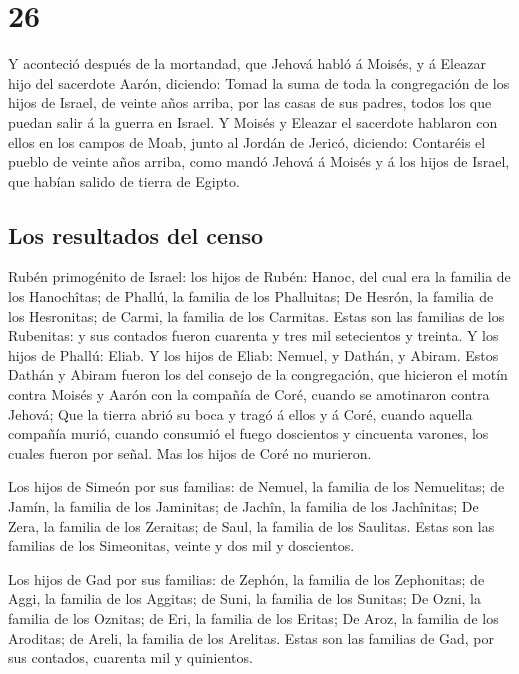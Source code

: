 \hypertarget{section-25}{%
\section{26}\label{section-25}}

 Y aconteció después de la mortandad, que Jehová habló á
Moisés, y á Eleazar hijo del sacerdote Aarón, diciendo: 
Tomad la suma de toda la congregación de los hijos de Israel, de veinte
años arriba, por las casas de sus padres, todos los que puedan salir á
la guerra en Israel.  Y Moisés y Eleazar el sacerdote
hablaron con ellos en los campos de Moab, junto al Jordán de Jericó,
diciendo:  Contaréis el pueblo de veinte años arriba, como
mandó Jehová á Moisés y á los hijos de Israel, que habían salido de
tierra de Egipto.

\hypertarget{los-resultados-del-censo-1}{%
\subsection{Los resultados del censo}\label{los-resultados-del-censo-1}}

 Rubén primogénito de Israel: los hijos de Rubén: Hanoc,
del cual era la familia de los Hanochîtas; de Phallú, la familia de los
Phalluitas;  De Hesrón, la familia de los Hesronitas; de
Carmi, la familia de los Carmitas.  Estas son las familias
de los Rubenitas: y sus contados fueron cuarenta y tres mil setecientos
y treinta.  Y los hijos de Phallú: Eliab.  Y
los hijos de Eliab: Nemuel, y Dathán, y Abiram. Estos Dathán y Abiram
fueron los del consejo de la congregación, que hicieron el motín contra
Moisés y Aarón con la compañía de Coré, cuando se amotinaron contra
Jehová;  Que la tierra abrió su boca y tragó á ellos y á
Coré, cuando aquella compañía murió, cuando consumió el fuego doscientos
y cincuenta varones, los cuales fueron por señal.  Mas
los hijos de Coré no murieron.

 Los hijos de Simeón por sus familias: de Nemuel, la
familia de los Nemuelitas; de Jamín, la familia de los Jaminitas; de
Jachîn, la familia de los Jachînitas;  De Zera, la
familia de los Zeraitas; de Saul, la familia de los Saulitas.
 Estas son las familias de los Simeonitas, veinte y dos
mil y doscientos.

 Los hijos de Gad por sus familias: de Zephón, la familia
de los Zephonitas; de Aggi, la familia de los Aggitas; de Suni, la
familia de los Sunitas;  De Ozni, la familia de los
Oznitas; de Eri, la familia de los Eritas;  De Aroz, la
familia de los Aroditas; de Areli, la familia de los Arelitas.
 Estas son las familias de Gad, por sus contados,
cuarenta mil y quinientos.

